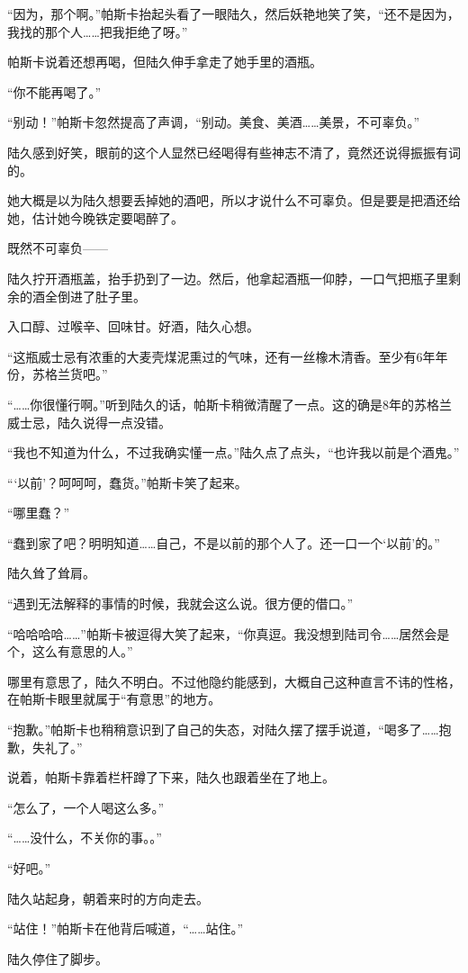 “因为，那个啊。”帕斯卡抬起头看了一眼陆久，然后妖艳地笑了笑，“还不是因为，我找的那个人……把我拒绝了呀。”

帕斯卡说着还想再喝，但陆久伸手拿走了她手里的酒瓶。

“你不能再喝了。”

“别动！”帕斯卡忽然提高了声调，“别动。美食、美酒……美景，不可辜负。”

陆久感到好笑，眼前的这个人显然已经喝得有些神志不清了，竟然还说得振振有词的。

她大概是以为陆久想要丢掉她的酒吧，所以才说什么不可辜负。但是要是把酒还给她，估计她今晚铁定要喝醉了。

既然不可辜负——

陆久拧开酒瓶盖，抬手扔到了一边。然后，他拿起酒瓶一仰脖，一口气把瓶子里剩余的酒全倒进了肚子里。

入口醇、过喉辛、回味甘。好酒，陆久心想。

“这瓶威士忌有浓重的大麦壳煤泥熏过的气味，还有一丝橡木清香。至少有6年年份，苏格兰货吧。”

“……你很懂行啊。”听到陆久的话，帕斯卡稍微清醒了一点。这的确是8年的苏格兰威士忌，陆久说得一点没错。

“我也不知道为什么，不过我确实懂一点。”陆久点了点头，“也许我以前是个酒鬼。”

“‘以前’？呵呵呵，蠢货。”帕斯卡笑了起来。

“哪里蠢？”

“蠢到家了吧？明明知道……自己，不是以前的那个人了。还一口一个‘以前’的。”

陆久耸了耸肩。

“遇到无法解释的事情的时候，我就会这么说。很方便的借口。”

“哈哈哈哈……”帕斯卡被逗得大笑了起来，“你真逗。我没想到陆司令……居然会是个，这么有意思的人。”

哪里有意思了，陆久不明白。不过他隐约能感到，大概自己这种直言不讳的性格，在帕斯卡眼里就属于“有意思”的地方。

“抱歉。”帕斯卡也稍稍意识到了自己的失态，对陆久摆了摆手说道，“喝多了……抱歉，失礼了。”

说着，帕斯卡靠着栏杆蹲了下来，陆久也跟着坐在了地上。

“怎么了，一个人喝这么多。”

“……没什么，不关你的事。。”

“好吧。”

陆久站起身，朝着来时的方向走去。

“站住！”帕斯卡在他背后喊道，“……站住。”

陆久停住了脚步。

